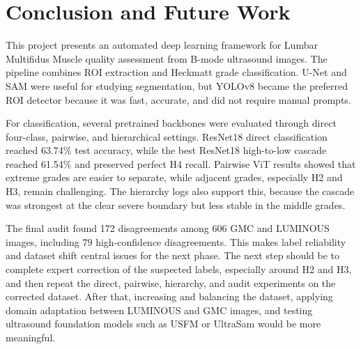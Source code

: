 \chapter{Conclusion and Future Work}
\label{chap:conclusion_future_work}
\label{conclusion}
This project presents an automated deep learning framework for Lumbar Multifidus Muscle quality assessment from B-mode ultrasound images. The pipeline combines ROI extraction and Heckmatt grade classification. U-Net and SAM were useful for studying segmentation, but YOLOv8 became the preferred ROI detector because it was fast, accurate, and did not require manual prompts.

For classification, several pretrained backbones were evaluated through direct four-class, pairwise, and hierarchical settings. ResNet18 direct classification reached 63.74\% test accuracy, while the best ResNet18 high-to-low cascade reached 61.54\% and preserved perfect H4 recall. Pairwise ViT results showed that extreme grades are easier to separate, while adjacent grades, especially H2 and H3, remain challenging. The hierarchy logs also support this, because the cascade was strongest at the clear severe boundary but less stable in the middle grades.

The final audit found 172 disagreements among 606 GMC and LUMINOUS images, including 79 high-confidence disagreements. This makes label reliability and dataset shift central issues for the next phase. The next step should be to complete expert correction of the suspected labels, especially around H2 and H3, and then repeat the direct, pairwise, hierarchy, and audit experiments on the corrected dataset. After that, increasing and balancing the dataset, applying domain adaptation between LUMINOUS and GMC images, and testing ultrasound foundation models such as USFM or UltraSam would be more meaningful.

